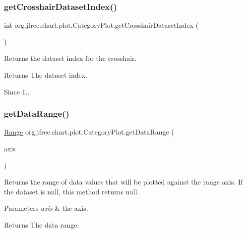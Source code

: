 \subsubsection{\texorpdfstring{get\+Crosshair\+Dataset\+Index()}{getCrosshairDatasetIndex()}}
{\footnotesize\ttfamily int org.\+jfree.\+chart.\+plot.\+Category\+Plot.\+get\+Crosshair\+Dataset\+Index (\begin{DoxyParamCaption}{ }\end{DoxyParamCaption})}

Returns the dataset index for the crosshair.

\begin{DoxyReturn}{Returns}
The dataset index.
\end{DoxyReturn}
\begin{DoxySince}{Since}
1.. 
\end{DoxySince}
\mbox{\label{classorg_1_1jfree_1_1chart_1_1plot_1_1_category_plot_a24ad189c085ce4d54b3c9bfbe18b9460}} 
\subsubsection{\texorpdfstring{get\+Data\+Range()}{getDataRange()}}
{\footnotesize\ttfamily \mbox{\hyperlink{classorg_1_1jfree_1_1data_1_1_range}{Range}} org.\+jfree.\+chart.\+plot.\+Category\+Plot.\+get\+Data\+Range (\begin{DoxyParamCaption}\item[{\mbox{\hyperlink{classorg_1_1jfree_1_1chart_1_1axis_1_1_value_axis}{Value\+Axis}}}]{axis }\end{DoxyParamCaption})}

Returns the range of data values that will be plotted against the range axis. If the dataset is {\ttfamily null}, this method returns {\ttfamily null}.


\begin{DoxyParams}{Parameters}
{\em axis} & the axis.\\
\hline
\end{DoxyParams}
\begin{DoxyReturn}{Returns}
The data range. 
\end{DoxyReturn}


